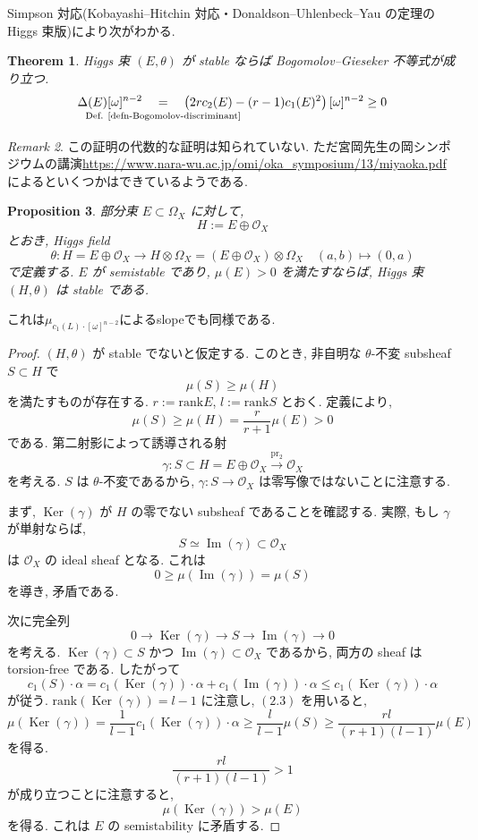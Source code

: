\documentclass[dvipdfmx,a4paper,11pt]{article} %
\newtheorem{thm}{Theorem}[section]
\newtheorem{prop}[thm]{Proposition}
\theoremstyle{definition}
\theoremstyle{remark}
\newtheorem{rem}[thm]{Remark}
\numberwithin{equation}{section}
\newcommand{\underalign}[2]{\quad \underset{\mathclap{\strut #1}}{#2}\quad}
\begin{document}
Simpson 対応(Kobayashi--Hitchin 対応・Donaldson--Uhlenbeck--Yau の定理のHiggs 束版)により次がわかる. 
\begin{thm}\cite{Sim88}
 Higgs 束 \((E,\theta)\) が stable ならば
 Bogomolov--Gieseker 不等式が成り立つ. 
$$
\Delta(E) [\omega]^{n-2}
\underalign{\text{Def. \ref{defn-Bogomolov-discriminant}}}{=}
\left(2r c_2(E)-(r-1)c_1(E)^2\right)[\omega]^{n-2}
\ge 0
$$
\end{thm}
\begin{rem}
この証明の代数的な証明は知られていない. ただ宮岡先生の岡シンポジウムの講演\url{https://www.nara-wu.ac.jp/omi/oka_symposium/13/miyaoka.pdf}によるといくつかはできているようである. 
\end{rem}
\begin{prop}\cite{GKPT19b}\cite{IMM24}
\label{prop-IMM24}
部分束
\(
E\subset \Omega_X
\)
に対して,
\[
H:=E\oplus \mathcal{O}_X
\]
とおき, Higgs field
\[
\theta\colon H=E\oplus \mathcal{O}_X
\longrightarrow
H\otimes \Omega_X
=
(E\oplus \mathcal{O}_X)\otimes \Omega_X
\quad 
(a,b)\longmapsto (0,a)
\]
で定義する.
\(E\) が semistable であり,
\(
\mu(E)>0
\)
を満たすならば, Higgs 束 \((H,\theta)\) は stable である.
\end{prop}
これは$\mu_{c_1(L) \cdot  [\omega]^{n-2}}$によるslopeでも同様である. 
\begin{proof}
$(H,\theta)$ が stable でないと仮定する. このとき, 非自明な
 $\theta$-不変 subsheaf $S\subset H$ で
\[
\mu(S)\geq \mu(H)
\]
を満たすものが存在する. $r:=\mathrm{rank}E$, $l:=\mathrm{rank}S$ とおく. 定義により,
\[
\mu (S)
\geq
\mu(H)
=
\frac{r}{r+1}\mu(E)
>
0
\]
である.
第二射影によって誘導される射
\[
\gamma:S\subset H=E\oplus \mathcal{O}_X
\xrightarrow{\operatorname{pr}_2}
\mathcal{O}_X
\]
を考える. $S$ は $\theta$-不変であるから,
$\gamma:S\to \mathcal{O}_X$ は零写像ではないことに注意する.

まず, $\operatorname{Ker}(\gamma)$ が $H$ の零でない subsheaf であることを確認する. 実際, もし $\gamma$ が単射ならば,
\[
S\simeq \operatorname{Im}(\gamma)\subset \mathcal{O}_X
\]
は $\mathcal{O}_X$ の ideal sheaf となる. これは
\[
0\geq \mu(\operatorname{Im}(\gamma))=\mu(S)
\]
を導き, 矛盾である.

次に完全列
\[
0\longrightarrow \operatorname{Ker}(\gamma)
\longrightarrow S
\longrightarrow \operatorname{Im}(\gamma)
\longrightarrow 0
\]
を考える. $\operatorname{Ker}(\gamma)\subset S$ かつ
$\operatorname{Im}(\gamma)\subset \mathcal{O}_X$ であるから, 両方の sheaf は torsion-free である. したがって
\[
\tag{2.3}
c_1(S)\cdot \alpha
=
c_1(\operatorname{Ker}(\gamma))\cdot \alpha
+
c_1(\operatorname{Im}(\gamma))\cdot \alpha
\leq
c_1(\operatorname{Ker}(\gamma))\cdot \alpha
\]
が従う. $\mathrm{rank}(\operatorname{Ker}(\gamma))=l-1$ に注意し, $(2.3)$ を用いると,
\[
\mu(\operatorname{Ker}(\gamma))
=
\frac{1}{l-1}
c_1(\operatorname{Ker}(\gamma))\cdot \alpha
\geq
\frac{l}{l-1}\mu(S)
\geq
\frac{rl}{(r+1)(l-1)}\mu(E)
\]
を得る. 
\[
\frac{rl}{(r+1)(l-1)}>1
\]
が成り立つことに注意すると,
\[
\mu(\operatorname{Ker}(\gamma))>\mu(E)
\]
を得る. これは $E$ の semistability に矛盾する.
\end{proof}
\end{document}
